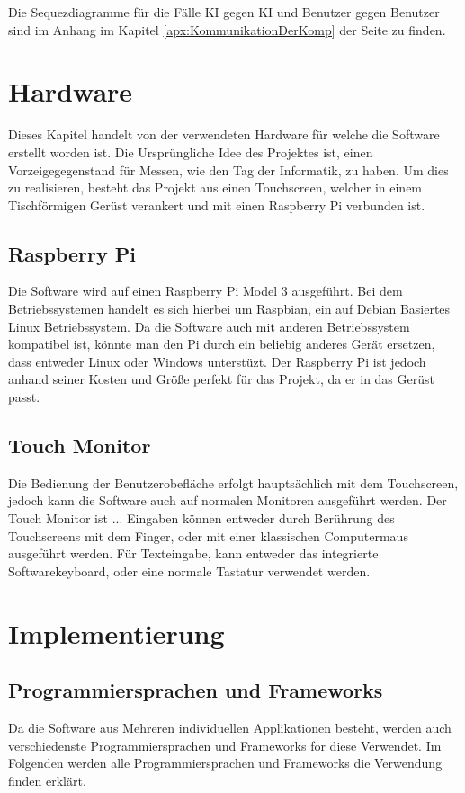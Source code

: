 \documentclass[12pt,a4paper,bibliography=totocnumbered,listof=totocnumbered]{article}
\begin{document}
Die Sequezdiagramme für die Fälle KI gegen KI und Benutzer gegen Benutzer sind im Anhang im Kapitel \ref{apx:KommunikationDerKomp} 
der Seite \pageref{apx:KommunikationDerKomp} zu finden.

\pagebreak
\section{Hardware}
Dieses Kapitel handelt von der verwendeten Hardware für welche die Software erstellt worden ist. 
Die Ursprüngliche Idee des Projektes ist, einen Vorzeigegegenstand für Messen, wie den Tag der Informatik, zu haben.
Um dies zu realisieren, besteht das Projekt aus einen Touchscreen, welcher in einem Tischförmigen Gerüst verankert 
und mit einen Raspberry Pi verbunden ist.

\subsection{Raspberry Pi}
Die Software wird auf einen Raspberry Pi Model 3 ausgeführt. Bei dem Betriebssystemen handelt es sich hierbei um 
Raspbian, ein auf Debian Basiertes Linux Betriebssystem. \cite{RaspberryPi} Da die Software auch mit anderen Betriebssystem
kompatibel ist, könnte man den Pi durch ein beliebig anderes Gerät ersetzen, dass entweder Linux oder Windows unterstüzt.
Der Raspberry Pi ist jedoch anhand seiner Kosten und Größe perfekt für das Projekt, da er in das Gerüst passt.

\subsection{Touch Monitor}
Die Bedienung der Benutzerobefläche erfolgt hauptsächlich mit dem Touchscreen, jedoch kann die Software auch auf normalen Monitoren ausgeführt werden.
Der Touch Monitor ist ...%
Eingaben können entweder durch Berührung des Touchscreens mit dem Finger, oder mit einer klassischen Computermaus ausgeführt werden.
Für Texteingabe, kann entweder das integrierte Softwarekeyboard, oder eine normale Tastatur verwendet werden.



\pagebreak
\section{Implementierung}

\subsection{Programmiersprachen und Frameworks}
Da die Software aus Mehreren individuellen Applikationen besteht, werden auch verschiedenste Programmiersprachen und Frameworks for diese Verwendet.
Im Folgenden werden alle Programmiersprachen und Frameworks die Verwendung finden erklärt.
\end{document}
